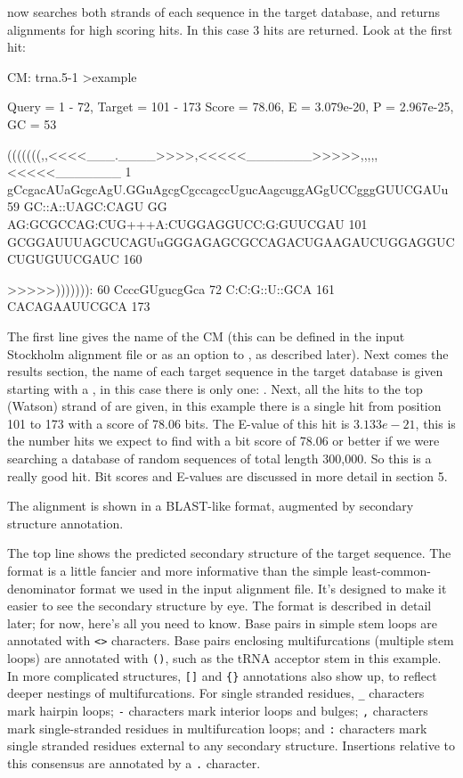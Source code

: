  now searches both strands of each sequence in the
target database, and returns alignments for high scoring hits.  In
this case 3 hits are returned. Look at the first hit:
\begin{sreoutput}
CM: trna.5-1
>example

 Query = 1 - 72, Target = 101 - 173
 Score = 78.06, E = 3.079e-20, P = 2.967e-25, GC =  53

           (((((((,,<<<<___.____>>>>,<<<<<_______>>>>>,,,,,<<<<<_______
         1 gCcgacAUaGcgcAgU.GGuAgcgCgccagccUgucAagcuggAGgUCCgggGUUCGAUu 59      
           GC::A::UAGC:CAGU GG AG:GCGCCAG:CUG+++A:CUGGAGGUCC:G:GUUCGAU 
       101 GCGGAUUUAGCUCAGUuGGGAGAGCGCCAGACUGAAGAUCUGGAGGUCCUGUGUUCGAUC 160     

           >>>>>))))))):
        60 CcccGUgucgGca 72      
           C:C:G::U::GCA
       161 CACAGAAUUCGCA 173     

\end{sreoutput}

The first line gives the name of the CM (this can be defined in the
input Stockholm alignment file or as an option to , as
described later). Next comes the results section, the name of each
target sequence in the target database is given starting with a
\prog{$>$}, in this case there is only one: . Next, all
the hits to the top (Watson) strand of  are given, in
this example there is a single hit from position 101 to 173 with a
score of 78.06 bits. The E-value of this hit is $3.133e-21$, this is
the number hits we expect to find with a bit score of 78.06 or better
if we were searching a database of random sequences of total length
300,000. So this is a really good hit. Bit scores and E-values are
discussed in more detail in section 5.

The alignment is shown in a BLAST-like format, augmented by secondary
structure annotation. 

The top line shows the predicted secondary structure of the target
sequence. The format is a little fancier and more informative than the
simple least-common-denominator format we used in the input alignment
file. It's designed to make it easier to see the
secondary structure by eye. The format is described in detail later;
for now, here's all you need to know. Base pairs in simple stem loops
are annotated with \verb+<>+ characters. Base pairs enclosing
multifurcations (multiple stem loops) are annotated with \verb+()+,
such as the tRNA acceptor stem in this example. In more complicated
structures, \verb+[]+ and \verb+{}+ annotations also show up, to
reflect deeper nestings of multifurcations. For single stranded
residues, \verb+_+ characters mark hairpin loops; \verb+-+ characters mark
interior loops and bulges; \verb+,+ characters mark single-stranded residues
in multifurcation loops; and \verb+:+ characters mark single stranded
residues external to any secondary structure. Insertions relative to
this consensus are annotated by a \verb+.+ character.

